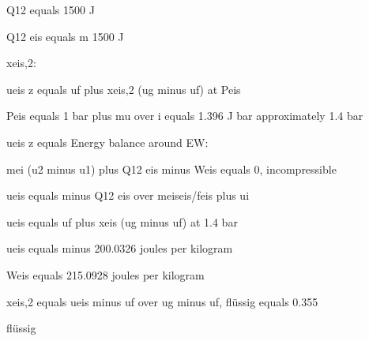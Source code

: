 Q12 equals 1500 J

Q12 eis equals m 1500 J

xeis,2:

ueis z equals uf plus xeis,2 (ug minus uf) at Peis

Peis equals 1 bar plus mu over i equals 1.396 J bar approximately 1.4 bar

ueis z equals Energy balance around EW:

mei (u2 minus u1) plus Q12 eis minus Weis equals 0, incompressible

ueis equals minus Q12 eis over meiseis/feis plus ui

ueis equals uf plus xeis (ug minus uf) at 1.4 bar

ueis equals minus 200.0326 joules per kilogram

Weis equals 215.0928 joules per kilogram

xeis,2 equals ueis minus uf over ug minus uf, flüssig equals 0.355

flüssig